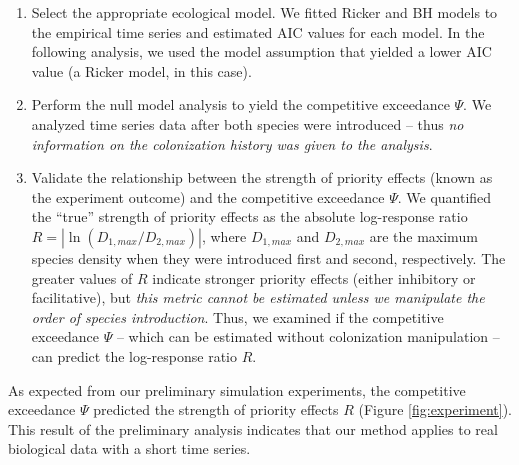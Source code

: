 \documentclass[12pt, class=article, crop=false]{standalone}
\begin{document}
\begin{enumerate}
    \item Select the appropriate ecological model.
    We fitted Ricker and BH models to the empirical time series and estimated AIC values for each model.
    In the following analysis, we used the model assumption that yielded a lower AIC value (a Ricker model, in this case).
    \item Perform the null model analysis to yield the competitive exceedance $\Psi$.
    We analyzed time series data after both species were introduced -- thus \textit{no information on the colonization history was given to the analysis}.
    \item Validate the relationship between the strength of priority effects (known as the experiment outcome) and the competitive exceedance $\Psi$.
    We quantified the ``true'' strength of priority effects as the absolute log-response ratio $R = |\ln (D_{1, max} / D_{2, max})|$, where $D_{1, max}$ and $D_{2, max}$ are the maximum species density when they were introduced first and second, respectively.
    The greater values of $R$ indicate stronger priority effects (either inhibitory or facilitative), but \textit{this metric cannot be estimated unless we manipulate the order of species introduction}.
    Thus, we examined if the competitive exceedance $\Psi$ -- which can be estimated without colonization manipulation -- can predict the log-response ratio $R$.
\end{enumerate}

As expected from our preliminary simulation experiments, the competitive exceedance $\Psi$ predicted the strength of priority effects $R$ (Figure \ref{fig:experiment}).
This result of the preliminary analysis indicates that our method applies to real biological data with a short time series.
\end{document}
